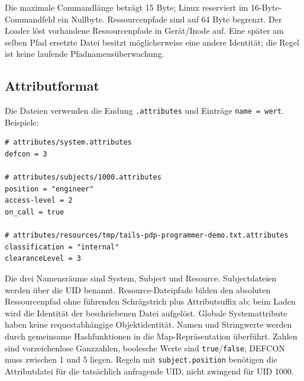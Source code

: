 \documentclass[12pt,a4paper]{article}
\begin{document}
Die maximale Commandlänge beträgt 15 Byte; Linux reserviert im 16-Byte-Commandfeld
ein Nullbyte. Ressourcenpfade sind auf 64 Byte begrenzt. Der Loader löst vorhandene
Ressourcenpfade in Gerät/Inode auf. Eine später am selben Pfad ersetzte Datei besitzt
möglicherweise eine andere Identität; die Regel ist keine laufende Pfadnamensüberwachung.

\subsection{Attributformat}
Die Dateien verwenden die Endung \texttt{.attributes} und Einträge
\texttt{name = wert}. Beispiele:
\begin{lstlisting}
# attributes/system.attributes
defcon = 3

# attributes/subjects/1000.attributes
position = "engineer"
access-level = 2
on_call = true

# attributes/resources/tmp/tails-pdp-programmer-demo.txt.attributes
classification = "internal"
clearanceLevel = 3
\end{lstlisting}
Die drei Namensräume sind System, Subject und Resource. Subjectdateien werden
über die UID benannt. Resource-Dateipfade bilden den absoluten Ressourcenpfad
ohne führenden Schrägstrich plus Attributsuffix ab; beim Laden wird die Identität
der beschriebenen Datei aufgelöst. Globale Systemattribute haben keine
requestabhängige Objektidentität. Namen und Stringwerte werden durch gemeinsame
Hashfunktionen in die Map-Repräsentation überführt. Zahlen sind vorzeichenlose
Ganzzahlen, boolesche Werte sind \texttt{true}/\texttt{false}; DEFCON muss zwischen
1 und 5 liegen. Regeln mit \texttt{subject.position} benötigen die Attributdatei
für die tatsächlich anfragende UID, nicht zwingend für UID 1000.
\end{document}
